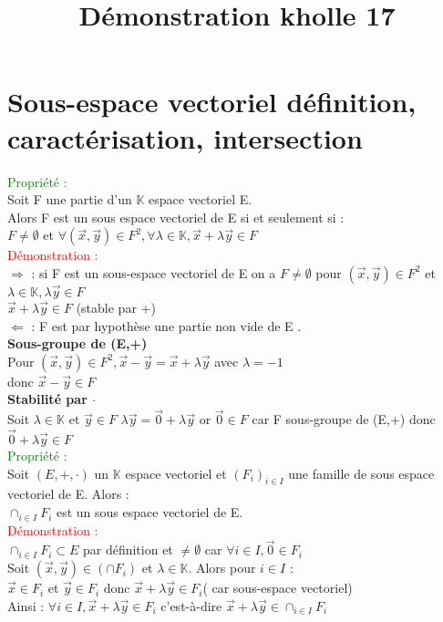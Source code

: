 \documentclass{article}
\begin{document}
\title{Démonstration kholle 17}
\date{}
\maketitle
	\renewcommand{\thesection}{\Roman{section}}
	\setlength{\parindent}{1.5cm}
\section{Sous-espace vectoriel définition, caractérisation, intersection}
\textcolor{green}{Propriété :} \\ 
Soit F une partie d'un $\mathbb{K}$ espace vectoriel E.\\ 
Alors F est un sous espace vectoriel de E si et seulement si : \\ 
$F \neq \emptyset$ et $\forall (\vec{x},\vec{y}) \in F^2, \forall \lambda \in \mathbb{K}, \vec{x}+ \lambda \vec{y} \in F$ \\ 
\textcolor{red}{Démonstration :} \\ 
$\Rightarrow$ : si F est un sous-espace vectoriel de E on a $F \neq \emptyset$ pour $(\vec{x},\vec{y}) \in F^2$ et $\lambda \in \mathbb{K}, \lambda \vec{y} \in F$ \\ 
$\vec{x} + \lambda \vec{y} \in F$ (stable par +) \\ 
$\Leftarrow$ : F est par hypothèse une partie non vide de E . \\ 
{\bf Sous-groupe  de (E,+)} \\ 
Pour $(\vec{x}, \vec{y}) \in F^2, \vec{x} - \vec{y} = \vec{x} + \lambda \vec{y}$ avec $\lambda = -1$ \\  donc $\vec{x} - \vec{y} \in F$ \\ 
{\bf Stabilité par $\cdot$} \\ 
Soit $\lambda \in \mathbb{K}$ et $ \vec{y} \in F$ $\lambda \vec{y}=\vec{0}+\lambda \vec{y}$ or $\vec{0} \in F$ car F sous-groupe de (E,+) donc $\vec{0}+ \lambda \vec{y} \in F$ \\ 
\textcolor{green}{Propriété :} \\ 
Soit $(E,+,\cdot)$ un $\mathbb{K}$ espace vectoriel et $(F_i)_{i \in I}$ une famille de sous espace vectoriel de E. Alors : \\ 
$\cap_{i \in I} F_i$ est un sous espace vectoriel de E. \\ 
\textcolor{red}{Démonstration :}  \\ 
$\cap_{i \in I} F_i \subset E$ par définition et $\neq \emptyset$ car $\forall i \in I, \vec{0} \in F_i$ \\ 
Soit $(\vec{x},\vec{y}) \in (\cap F_i)$ et $\lambda \in \mathbb{K}$. Alors pour $i\in I$ : \\
$\vec{x} \in F_i$ et $\vec{y} \in F_i$ donc $\vec{x}+ \lambda \vec{y}\in F_i$( car sous-espace vectoriel) \\ 
Ainsi : $\forall i \in I, \vec{x} + \lambda \vec{y} \in F_i$ c'est-à-dire $\vec{x}+ \lambda \vec{y} \in \cap_{i \in I} F_i$
\end{document}
